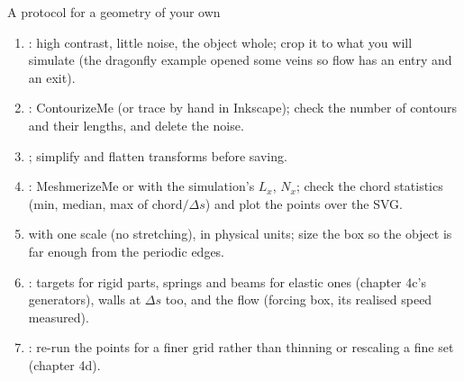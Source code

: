 \documentclass[aspectratio=169,11pt]{beamer}
\begin{document}
\begin{frame}{A protocol for a geometry of your own}
\label{fr:protocol}
\small
\begin{enumerate}
  \item {}: high contrast, little noise, the object whole; crop it to what you will simulate (the dragonfly example opened some veins so flow has an entry and an exit).
  \item {}: ContourizeMe (or trace by hand in Inkscape); check the number of contours and their lengths, and delete the noise.
  \item {}; simplify and flatten transforms before saving.
  \item {}: MeshmerizeMe or  with the simulation's $L_x$, $N_x$; check the chord statistics (min, median, max of chord$/\Delta s$) and plot the points over the SVG.
  \item {} with one scale (no stretching), in physical units; size the box so the object is far enough from the periodic edges.
  \item {}: targets for rigid parts, springs and beams for elastic ones (chapter 4c's generators), walls at $\Delta s$ too, and the flow (forcing box, its realised speed measured).
  \item {}: re-run the points for a finer grid rather than thinning or rescaling a fine set (chapter 4d).
\end{enumerate}
\end{frame}
\end{document}
